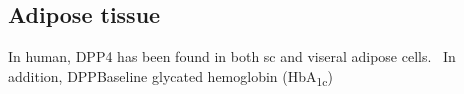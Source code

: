 \subsection{Adipose tissue}
In human, DPP4 has been found in both sc and viseral adipose cells.~\cite{Lamers2011} In addition, DPPBaseline glycated hemoglobin (HbA\textsubscript{1c}) 